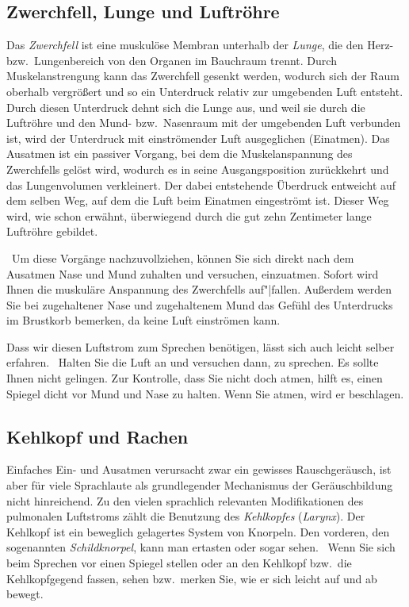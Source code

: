 \subsection{Zwerchfell, Lunge und Luftröhre}
\label{sec:zwerchfelllungeundluftroehre}

Das \textit{Zwerchfell} ist eine muskulöse Membran unterhalb der \textit{Lunge}, die den Herz- bzw.\ Lungenbereich von den Organen im Bauchraum trennt.
Durch Muskelanstrengung kann das Zwerchfell gesenkt werden, wodurch sich der Raum oberhalb vergrößert und so ein Unterdruck relativ zur umgebenden Luft entsteht.
Durch diesen Unterdruck dehnt sich die Lunge aus, und weil sie durch die Luftröhre und den Mund- bzw.\ Nasenraum mit der umgebenden Luft verbunden ist, wird der Unterdruck mit einströmender Luft ausgeglichen (Einatmen).
Das Ausatmen ist ein passiver Vorgang, bei dem die Muskelanspannung des Zwerchfells gelöst wird, wodurch es in seine Ausgangsposition zurückkehrt und das Lungenvolumen verkleinert.
Der dabei entstehende Überdruck entweicht auf dem selben Weg, auf dem die Luft beim Einatmen eingeströmt ist.
Dieser Weg wird, wie schon erwähnt, überwiegend durch die gut zehn Zentimeter lange Luftröhre gebildet.

\TuBegin~Um diese Vorgänge nachzuvollziehen, können Sie sich direkt nach dem Ausatmen Nase und Mund zuhalten und versuchen, einzuatmen.
Sofort wird Ihnen die muskuläre Anspannung des Zwerchfells auf"|fallen.
Außerdem werden Sie bei zugehaltener Nase und zugehaltenem Mund das Gefühl des Unterdrucks im Brustkorb bemerken, da keine Luft einströmen kann.

Dass wir diesen Luftstrom zum Sprechen benötigen, lässt sich auch leicht selber erfahren.
\TuBegin~Halten Sie die Luft an und versuchen dann, zu sprechen.
Es sollte Ihnen nicht gelingen.
Zur Kontrolle, dass Sie nicht doch atmen, hilft es, einen Spiegel dicht vor Mund und Nase zu halten.
Wenn Sie atmen, wird er beschlagen.

\subsection{Kehlkopf und Rachen}
\label{sec:kehlkopfundrachen}

Einfaches Ein- und Ausatmen verursacht zwar ein gewisses Rauschgeräusch, ist aber für viele Sprachlaute als grundlegender Mechanismus der Geräuschbildung nicht hinreichend.
Zu den vielen sprachlich relevanten Modifikationen des pulmonalen Luftstroms zählt die Benutzung des \textit{Kehlkopfes} (\textit{Larynx}).
Der Kehlkopf ist ein beweglich gelagertes System von Knorpeln.
Den vorderen, den sogenannten \textit{Schildknorpel}, kann man ertasten oder sogar sehen.
\TuBegin~Wenn Sie sich beim Sprechen vor einen Spiegel stellen oder an den Kehlkopf bzw.\ die Kehlkopfgegend fassen, sehen bzw.\ merken Sie, wie er sich leicht auf und ab bewegt.

